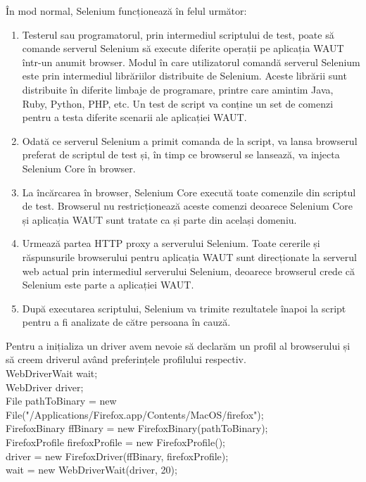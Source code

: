 \documentclass[12pt]{book}
\begin{document}
În mod normal, Selenium funcționează în felul următor:
\begin{addmargin}[4em]{1em}
	\begin{enumerate}
		\item Testerul sau programatorul, prin intermediul scriptului de test, poate să comande serverul Selenium să execute diferite operații pe aplicația WAUT 	într-un anumit browser. Modul în care utilizatorul comandă serverul Selenium este prin intermediul librăriilor distribuite de Selenium. Aceste librării sunt distribuite în diferite limbaje de programare, printre care amintim Java, Ruby, Python, PHP, etc. Un test de script va conține un set de comenzi pentru a testa diferite scenarii ale aplicației WAUT. 
		\item Odată ce serverul Selenium a primit comanda de la script, va lansa browserul preferat de scriptul de test și, în timp ce browserul se lansează, va injecta Selenium Core în browser.
		\item La încărcarea în browser, Selenium Core execută toate comenzile din scriptul de test. Browserul nu restricționează aceste comenzi deoarece Selenium Core și aplicația WAUT sunt tratate ca și parte din același domeniu.
		\item Urmează partea HTTP proxy a serverului Selenium. Toate cererile și răspunsurile browserului pentru aplicația WAUT sunt direcționate la serverul web actual prin intermediul serverului Selenium, deoarece browserul crede că Selenium este parte a aplicației WAUT. 
		\item După executarea scriptului, Selenium va trimite rezultatele înapoi la script pentru a fi analizate de către persoana în cauză.\cite{SeleniumBook}
	\end{enumerate}
\end{addmargin}

Pentru a inițializa un driver avem nevoie să declarăm un profil al browserului și să creem driverul având preferințele profilului respectiv.\\
WebDriverWait wait;\\
WebDriver driver;\\
File pathToBinary = new File("/Applications/Firefox.app/Contents/MacOS/firefox"); \\
FirefoxBinary ffBinary = new FirefoxBinary(pathToBinary); \\
FirefoxProfile firefoxProfile = new FirefoxProfile(); \\
driver = new FirefoxDriver(ffBinary, firefoxProfile);\\
wait = new WebDriverWait(driver, 20);
\end{document}
